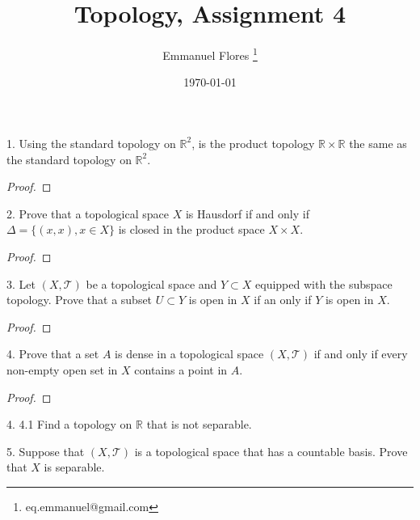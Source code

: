 \documentclass[12pt]{article}
\title{Topology, Assignment 4}
\author{Emmanuel Flores \thanks{eq.emmanuel@gmail.com}}
\date{\today}
\begin{document}
\maketitle


1. Using the standard topology on $\mathbb{R}^{2}$, is the product topology $\mathbb{R}\times\mathbb{R}$ the same as the standard topology on $\mathbb{R}^{2}$.

\begin{proof}
\end{proof}
2. Prove that a topological space $X$ is Hausdorf if and only if $\Delta = \{(x,x),x\in X\}$ is closed in the product space $X\times X$.
\begin{proof}
\end{proof}

3. Let $\left( X,\mathcal{T}\right)$ be a topological space and $Y\subset X$ equipped with the subspace topology. Prove that a subset $U\subset Y$ is open in $X$ if an only if $Y$ is open in $X$.
\begin{proof}
\end{proof}

4. Prove that a set $A$ is dense in a topological space $\left( X,\mathcal{T}\right)$ if and only if every non-empty open set in $X$ contains a point in $A$.
\begin{proof}
\end{proof}

4. 4.1 Find a topology on $\mathbb{R}$ that is not separable.

5. Suppose that $\left( X,\mathcal{T}\right)$ is a topological space that has a countable basis. Prove that $X$ is separable.
 
\end{document}
